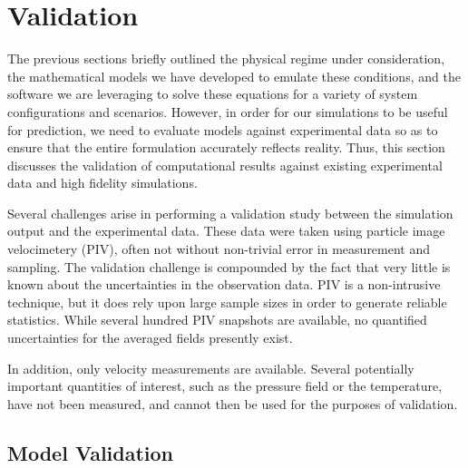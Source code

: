 
\section{Validation}
\label{sec:validation}

%
%

The previous sections briefly outlined the physical regime under
consideration, the mathematical models we have developed to emulate
these conditions, and the software we are leveraging to solve these
equations for a variety of system configurations and scenarios. 
However, in order for our simulations to be useful for prediction, we
need to evaluate models against experimental data so
as to ensure that the entire formulation accurately reflects reality. 
Thus, this section discusses the validation of computational results
against existing experimental data and high fidelity simulations.

%
%
Several challenges arise in performing a validation study between the
simulation output and the experimental data. These data were taken using
particle image velocimetery (PIV), often not without non-trivial error
in measurement and sampling. 
The validation challenge is compounded by the fact that very little is
known about the uncertainties in the observation data. PIV is a
non-intrusive technique, but it does rely upon large sample sizes in
order to generate reliable statistics. While several hundred PIV
snapshots are available, no quantified uncertainties for the averaged fields
presently exist.  

In addition, only velocity measurements are available. Several
potentially important quantities of interest, such as the pressure field
or the temperature, have not been measured, and cannot then be used for
the purposes of validation. 


%
%
%
% 


\subsection{Model Validation}


